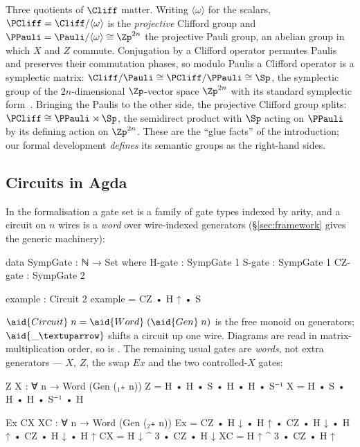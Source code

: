 Three quotients of $\Cliff$ matter.  Writing $\langle\omega\rangle$ for
the scalars, $\PCliff = \Cliff/\langle\omega\rangle$ is the
\emph{projective} Clifford group and $\PPauli =
\Pauli/\langle\omega\rangle \cong \Zp^{2n}$ the projective Pauli group,
an abelian group in which $X$ and $Z$ commute.  Conjugation by a Clifford
operator permutes Paulis and preserves their commutation phases, so
modulo Paulis a Clifford operator is a symplectic matrix: $\Cliff/\Pauli
\cong \PCliff/\PPauli \cong \Sp$, the symplectic group of the
$2n$-dimensional $\Zp$-vector space $\Zp^{2n}$ with its standard
symplectic form~\cite{bian2026qudit}.  Bringing the Paulis to the other
side, the projective Clifford group splits: $\PCliff \cong \PPauli
\rtimes \Sp$, the semidirect product with $\Sp$ acting on $\PPauli$ by
its defining action on $\Zp^{2n}$.  These are the ``glue facts'' of the
introduction; our formal development \emph{defines} its semantic groups
as the right-hand sides.

\subsection{Circuits in Agda}

In the formalisation a gate set is a family of gate types indexed by
arity, and a circuit on $n$ wires is a \emph{word} over wire-indexed
generators (\S\ref{sec:framework} gives the generic machinery):

\begin{agdacode}
data SympGate : ℕ → Set where
  H-gate   : SympGate 1
  S-gate   : SympGate 1
  CZ-gate  : SympGate 2

example : Circuit 2
example = CZ • H ↑ • S
\end{agdacode}

$\aid{Circuit}\;n = \aid{Word}\;(\aid{Gen}\;n)$ is the free monoid on
generators; $\aid{{\_}↑}$ shifts a circuit up one wire.  Diagrams are
read in matrix-multiplication order, so  is
.  The remaining usual gates are \emph{words}, not
extra generators --- $X$, $Z$, the swap $\mathit{Ex}$ and the two
controlled-$X$ gates:

\begin{agdacode}
Z X : ∀ {n} → Word (Gen (₁₊ n))
Z = H • H • S • H • H • S⁻¹
X = H • S • H • H • S⁻¹ • H

Ex CX XC : ∀ {n} → Word (Gen (₂₊ n))
Ex = CZ • H ↓ • H ↑ • CZ • H ↓ • H ↑ • CZ • H ↓ • H ↑
CX = H ↓ ^ 3 • CZ • H ↓
XC = H ↑ ^ 3 • CZ • H ↑
\end{agdacode}
\begin{center}
  \qquad
\end{center}

